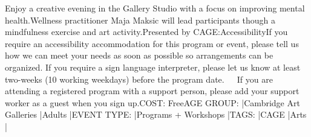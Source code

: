 \documentclass[letterpaper, 10pt]{article}
\begin{document}
\begin{multicols}{2}
{Enjoy a creative evening in the Gallery Studio with a focus on improving mental health.Wellness practitioner Maja Maksic will lead participants though a mindfulness exercise and art activity.Presented by CAGE:AccessibilityIf you require an accessibility accommodation for this program or event, please tell us how we can meet your needs as soon as possible so arrangements can be organized. If you require a sign language interpreter, please let us know at least two-weeks (10 working weekdays) before the program date.   If you are attending a registered program with a support person, please add your support worker as a guest when you sign up.COST: FreeAGE GROUP: |Cambridge Art Galleries |Adults |EVENT TYPE: |Programs + Workshops |TAGS: |CAGE |Arts |
}
\vspace{10px}
\end{multicols}
\end{document}
